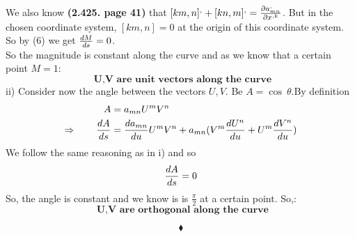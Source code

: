We also know \textbf{(2.425. page 41)} that $[km,n]^, + [kn,m]^, = \pdv{a^,_{mn}}{x^{,k}}$. But in the chosen coordinate system, $[km,n] = 0$ at the origin of this coordinate system. So by (6) we get $\dv{M}{s} = 0$.\\
So the magnitude is constant along the curve and as we know that a certain point $M =1$:\\
$$\textbf{ U,V are unit vectors along the curve}$$\newpage
ii) Consider now the angle between the vectors $U,V$. Be $A = \cos \ \theta$.By definition 
\begin{align}
\ A &= a_{mn}U ^mV^n\\
\Rightarrow \quad\quad \dv{A}{s} &= \dv{a_{mn}}{u}U^m V^n + a_{mn}(V^m \dv{U^n}{u} +U^m \dv{V^n}{u} )
\end{align}
We follow the same reasoning as in i) and so
$$\dv{A}{s} = 0$$
So, the angle is constant and we know is is $\frac{\pi}{2}$ at a certain point. So,:
$$\textbf{ U,V are orthogonal along the curve}$$

$$\blacklozenge$$
\newpage


